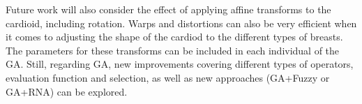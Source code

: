 \documentclass[conference]{IEEEtran}
\begin{document}



Future work will also consider the effect of applying affine transforms to the cardioid, including rotation. Warps and distortions can also be very efficient when it comes to adjusting the shape of the cardiod to the different types of breasts. The parameters for these transforms can be included in each individual of the GA. Still, regarding GA, new improvements covering different types of operators, evaluation function and selection, as well as new approaches (GA+Fuzzy or GA+RNA) can be explored. 



\end{document}
